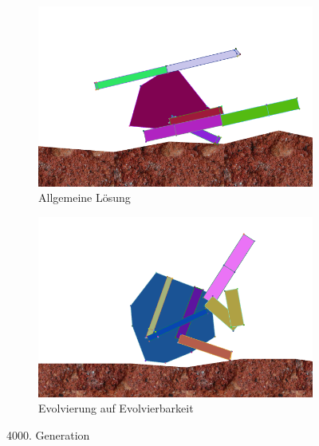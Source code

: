       \begin{figure}[H]
        \centering
        \begin{subfigure}[b]{0.45\textwidth}
          \includegraphics[width=\linewidth,center]{graphics/simulation-discussion/4_gen4000}
          \caption{Allgemeine Lösung\label{fig:gen4000_alg}}
        \end{subfigure}
        \begin{subfigure}[b]{0.45\textwidth}
          \includegraphics[width=\linewidth,center]{graphics/simulation-discussion/5_gen4000}
          \caption{Evolvierung auf Evolvierbarkeit\label{fig:gen4000_ev}}
        \end{subfigure}

        \caption{4000. Generation\label{fig:gen4000}}
      \end{figure}


